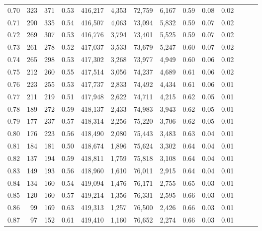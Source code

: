 \begin{tabular}{rrrrrrrrrrrrrr}
0.70 &     323 &    371 &  0.53 &  416,217 &    4,353 &  72,759 &   6,167 &  0.59 &  0.08 &      0.02 \\
0.71 &     290 &    335 &  0.54 &  416,507 &    4,063 &  73,094 &   5,832 &  0.59 &  0.07 &      0.02 \\
0.72 &     269 &    307 &  0.53 &  416,776 &    3,794 &  73,401 &   5,525 &  0.59 &  0.07 &      0.02 \\
0.73 &     261 &    278 &  0.52 &  417,037 &    3,533 &  73,679 &   5,247 &  0.60 &  0.07 &      0.02 \\
0.74 &     265 &    298 &  0.53 &  417,302 &    3,268 &  73,977 &   4,949 &  0.60 &  0.06 &      0.02 \\
0.75 &     212 &    260 &  0.55 &  417,514 &    3,056 &  74,237 &   4,689 &  0.61 &  0.06 &      0.02 \\
0.76 &     223 &    255 &  0.53 &  417,737 &    2,833 &  74,492 &   4,434 &  0.61 &  0.06 &      0.01 \\
0.77 &     211 &    219 &  0.51 &  417,948 &    2,622 &  74,711 &   4,215 &  0.62 &  0.05 &      0.01 \\
0.78 &     189 &    272 &  0.59 &  418,137 &    2,433 &  74,983 &   3,943 &  0.62 &  0.05 &      0.01 \\
0.79 &     177 &    237 &  0.57 &  418,314 &    2,256 &  75,220 &   3,706 &  0.62 &  0.05 &      0.01 \\
0.80 &     176 &    223 &  0.56 &  418,490 &    2,080 &  75,443 &   3,483 &  0.63 &  0.04 &      0.01 \\
0.81 &     184 &    181 &  0.50 &  418,674 &    1,896 &  75,624 &   3,302 &  0.64 &  0.04 &      0.01 \\
0.82 &     137 &    194 &  0.59 &  418,811 &    1,759 &  75,818 &   3,108 &  0.64 &  0.04 &      0.01 \\
0.83 &     149 &    193 &  0.56 &  418,960 &    1,610 &  76,011 &   2,915 &  0.64 &  0.04 &      0.01 \\
0.84 &     134 &    160 &  0.54 &  419,094 &    1,476 &  76,171 &   2,755 &  0.65 &  0.03 &      0.01 \\
0.85 &     120 &    160 &  0.57 &  419,214 &    1,356 &  76,331 &   2,595 &  0.66 &  0.03 &      0.01 \\
0.86 &      99 &    169 &  0.63 &  419,313 &    1,257 &  76,500 &   2,426 &  0.66 &  0.03 &      0.01 \\
0.87 &      97 &    152 &  0.61 &  419,410 &    1,160 &  76,652 &   2,274 &  0.66 &  0.03 &      0.01 \\

\end{tabular}
